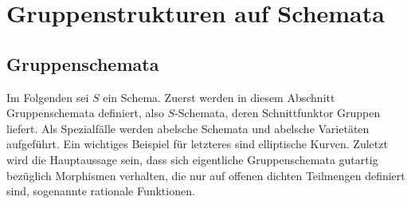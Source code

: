 \chapter{Gruppenstrukturen auf Schemata}
\label{chap:gruppenstrukturenaufschemata}
\section{Gruppenschemata}
Im Folgenden sei $S$ ein Schema.
Zuerst werden in diesem Abschnitt Gruppenschemata definiert, also
$S$-Schemata, deren Schnittfunktor Gruppen liefert. Als Spezialfälle
werden abelsche Schemata und abelsche Varietäten aufgeführt. Ein
wichtiges Beispiel für letzteres sind elliptische Kurven.
Zuletzt wird die Hauptaussage sein, dass sich eigentliche Gruppenschemata
gutartig bezüglich Morphismen verhalten, die nur auf offenen dichten
Teilmengen definiert sind, sogenannte rationale Funktionen.

